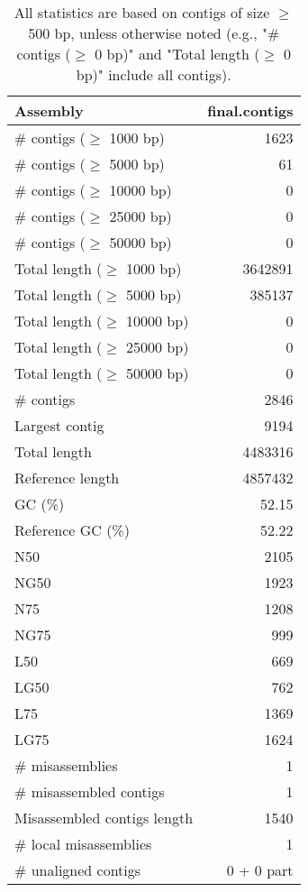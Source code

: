 \documentclass[12pt,a4paper]{article}
\begin{document}
\begin{table}[ht]
\begin{center}
\caption{All statistics are based on contigs of size $\geq$ 500 bp, unless otherwise noted (e.g., "\# contigs ($\geq$ 0 bp)" and "Total length ($\geq$ 0 bp)" include all contigs).}
\begin{tabular}{|l*{1}{|r}|}
\hline
Assembly & final.contigs \\ \hline
\# contigs ($\geq$ 1000 bp) & 1623 \\ \hline
\# contigs ($\geq$ 5000 bp) & 61 \\ \hline
\# contigs ($\geq$ 10000 bp) & 0 \\ \hline
\# contigs ($\geq$ 25000 bp) & 0 \\ \hline
\# contigs ($\geq$ 50000 bp) & 0 \\ \hline
Total length ($\geq$ 1000 bp) & 3642891 \\ \hline
Total length ($\geq$ 5000 bp) & 385137 \\ \hline
Total length ($\geq$ 10000 bp) & 0 \\ \hline
Total length ($\geq$ 25000 bp) & 0 \\ \hline
Total length ($\geq$ 50000 bp) & 0 \\ \hline
\# contigs & 2846 \\ \hline
Largest contig & 9194 \\ \hline
Total length & 4483316 \\ \hline
Reference length & 4857432 \\ \hline
GC (\%) & 52.15 \\ \hline
Reference GC (\%) & 52.22 \\ \hline
N50 & 2105 \\ \hline
NG50 & 1923 \\ \hline
N75 & 1208 \\ \hline
NG75 & 999 \\ \hline
L50 & 669 \\ \hline
LG50 & 762 \\ \hline
L75 & 1369 \\ \hline
LG75 & 1624 \\ \hline
\# misassemblies & 1 \\ \hline
\# misassembled contigs & 1 \\ \hline
Misassembled contigs length & 1540 \\ \hline
\# local misassemblies & 1 \\ \hline
\# unaligned contigs & 0 + 0 part \\ \hline

\end{tabular}
\end{center}
\end{table}
\end{document}
